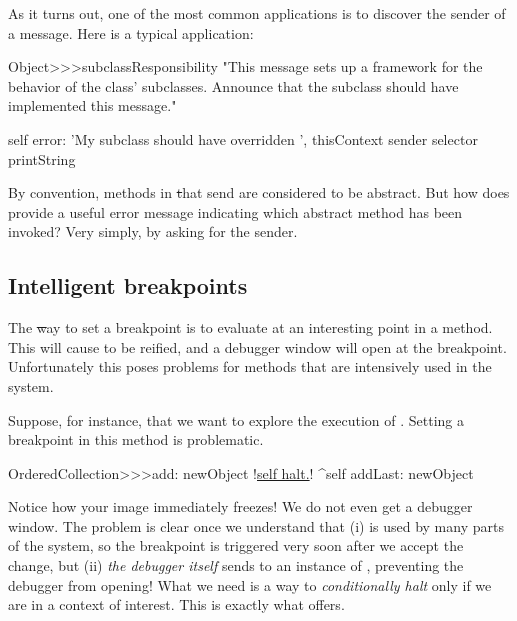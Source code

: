 \documentclass[a4paper,10pt,twoside]{book}
\begin{document}
As it turns out, one of the most common applications is to discover the sender of a message.
Here is a typical application:

\begin{code}{}
Object>>>subclassResponsibility
	"This message sets up a framework for the behavior of the class' subclasses.
	Announce that the subclass should have implemented this message."

	self error: 'My subclass should have overridden ', thisContext sender selector printString
\end{code}

By convention, methods in \st that send  are considered to be abstract.  But how does  provide a useful error message indicating which abstract method has been invoked?  Very simply, by asking  for the sender.


\subsection{Intelligent breakpoints}

The \st way to set a breakpoint is to evaluate  at an interesting point in a method.  This will cause  to be reified, and a debugger window will open at the breakpoint.
Unfortunately this poses problems for methods that are intensively used in the system.

Suppose, for instance, that we want to explore the execution of .
Setting a breakpoint in this method is problematic.

\begin{code}{}
OrderedCollection>>>add: newObject
	!\underline{self halt.}!
	^self addLast: newObject
\end{code}

Notice how your image immediately freezes!  We do not even get a debugger window.
The problem is clear once we understand that (i)  is used by many parts of the system, so the breakpoint is triggered very soon after we accept the change, but (ii) \emph{the debugger itself} sends  to an instance of , preventing the debugger from opening!
What we need is a way to \emph{conditionally halt} only if we are in a context of interest.
This is exactly what  offers.
\end{document}
